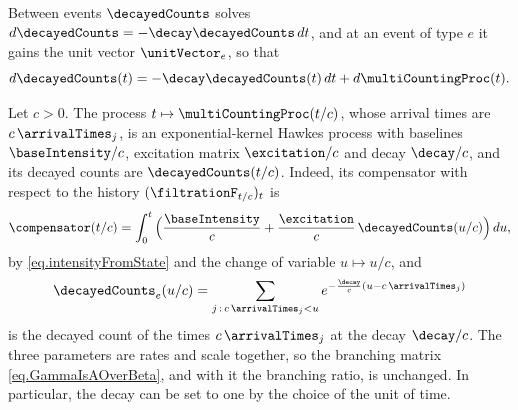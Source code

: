Between events $\decayedCounts$ solves $d\decayedCounts = -\decay \decayedCounts \, dt$,
and at an event of type $e$ it gains the unit vector $\unitVector_e$, so that
\begin{equation}\label{eq.stateDynamics}
 d\decayedCounts(t) = -\decay \decayedCounts(t) \, dt + d\multiCountingProc(t).
\end{equation}

\begin{remark}\label{remark.timeRescaling}
 Let $c > 0$.
 The process $t \mapsto \multiCountingProc(t/c)$,
 whose arrival times are $c\,\arrivalTimes_{j}$,
 is an exponential-kernel Hawkes process with baselines $\baseIntensity/c$,
 excitation matrix $\excitation/c$ and decay $\decay/c$,
 and its decayed counts are $\decayedCounts(t/c)$.
 Indeed, its compensator with respect to the history $(\filtrationF_{t/c})_{t}$ is
 \begin{equation*}
  \compensator(t/c)
  = \int_{0}^{t} \Big( \frac{\baseIntensity}{c}
  + \frac{\excitation}{c} \, \decayedCounts(u/c) \Big) \, du ,
 \end{equation*}
 by \eqref{eq.intensityFromState} and the change of variable $u \mapsto u/c$, and
 \begin{equation*}
  \decayedCounts_e(u/c) = \sum_{j \, : \, c\,\arrivalTimes_{j} < u}
  e^{-\frac{\decay}{c} (u - c\,\arrivalTimes_{j})}
 \end{equation*}
 is the decayed count of the times $c\,\arrivalTimes_{j}$ at the decay $\decay/c$.
 The three parameters are rates and scale together,
 so the branching matrix \eqref{eq.GammaIsAOverBeta},
 and with it the branching ratio, is unchanged.
 In particular, the decay can be set to one by the choice of the unit of time.
\end{remark}

